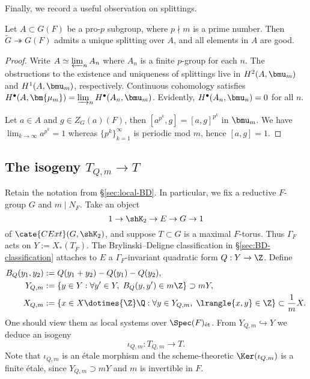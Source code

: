 \documentclass[a4paper,10pt]{article}
\begin{document}
Finally, we record a useful observation on splittings.
\begin{lemma}\label{prop:pro-p-splitting}
	Let $A \subset G(F)$ be a pro-$p$ subgroup, where $p \nmid m$ is a prime number. Then $\tilde{G} \twoheadrightarrow G(F)$ admits a unique splitting over $A$, and all elements in $A$ are good.
\end{lemma}
\begin{proof}
	Write $A \simeq \varprojlim_n A_n$ where $A_n$ is a finite $p$-group for each $n$. The obstructions to the existence and uniqueness of splittings live in $H^2(A, \bmu_m)$ and $H^1(A, \bmu_m)$, respectively. Continuous cohomology satisfies $H^\bullet(A, \bm{\mu_m}) = \varinjlim_n H^\bullet(A_n, \bmu_m)$. Evidently, $H^\bullet(A_n, \bmu_n) = 0$ for all $n$.
	
	Let $a \in A$ and $g \in Z_G(a)(F)$, then $[a^{p^k},g] = [a,g]^{p^k}$ in $\bmu_m$. We have $\lim_{k \to \infty} a^{p^k} = 1$ whereas $\{ p^k \}_{k=1}^\infty$ is periodic mod $m$, hence $[a, g]=1$.
\end{proof}

\subsection{The isogeny \texorpdfstring{$T_{Q,m} \to T$}{TQm to T}}\label{sec:isogeny}
Retain the notation from \S\ref{sec:local-BD}. In particular, we fix a reductive $F$-group $G$ and $m \mid N_F$. Take an object
\[ 1 \to \shK_2 \to E \to G \to 1 \]
of $\cate{CExt}(G, \shK_2)$, and suppose $T \subset G$ is a maximal $F$-torus. Thus $\Gamma_F$ acts on $Y := X_*(T_{\bar{F}})$. The Brylinski--Deligne classification in \S\ref{sec:BD-classification} attaches to $E$ a $\Gamma_F$-invariant quadratic form $Q: Y \to \Z$. Define  
\begin{align*}
	B_Q(y_1, y_2) & := Q(y_1 + y_2) - Q(y_1) - Q(y_2), \\
	Y_{Q,m} & := \left\{y \in Y: \forall y' \in Y, \; B_Q(y, y') \in m\Z \right\} \supset mY , \\
	X_{Q,m} & := \left\{x \in X \dotimes{\Z} \Q : \forall y \in Y_{Q,m}, \; \lrangle{x, y} \in \Z \right\} \subset \frac{1}{m} X.
\end{align*}
One should view them as local systems over $\Spec(F)_{\text{ét}}$. From $Y_{Q,m} \hookrightarrow Y$ we deduce an isogeny  
\[ \iota_{Q,m}: T_{Q,m} \to T. \]
Note that $\iota_{Q,m}$ is an étale morphism and the scheme-theoretic $\Ker(\iota_{Q,m})$ is a finite étale, since $Y_{Q,m} \supset mY$ and $m$ is invertible in $F$.
\end{document}
